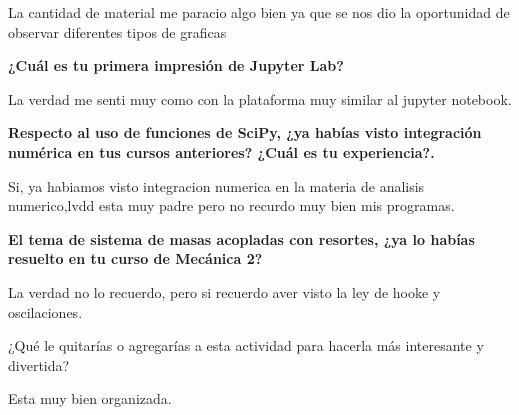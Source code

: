\documentclass{article}
\begin{document}
La cantidad de material me paracio algo bien ya que se nos dio la oportunidad de observar diferentes tipos de graficas

\vspace{0.3cm}
\textbf{¿Cuál es tu primera impresión de Jupyter Lab?}


La verdad me senti muy como con la plataforma muy similar al jupyter notebook.

\vspace{0.3cm}

\textbf{Respecto al uso de funciones de SciPy, ¿ya habías visto integración numérica en tus cursos anteriores? ¿Cuál es tu experiencia?.}

Si, ya habiamos visto integracion numerica en la materia de analisis numerico,lvdd esta muy padre pero no recurdo muy bien mis programas.

\vspace{0.3cm}

\textbf{El tema de sistema de masas acopladas con resortes, ¿ya lo habías resuelto en tu curso de Mecánica 2? } 

La verdad no lo recuerdo, pero si recuerdo aver visto la ley de hooke y oscilaciones.


\vspace{0.3cm}
¿Qué le quitarías o agregarías a esta actividad para hacerla más interesante y divertida? 

Esta muy bien organizada.




\vspace{0.3cm}
\end{document}
